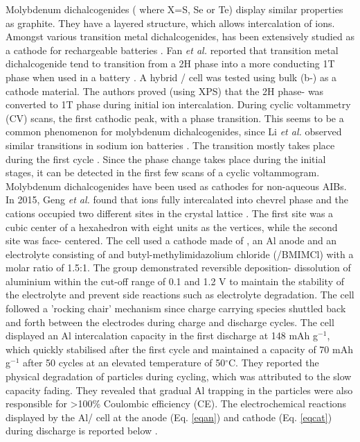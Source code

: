 Molybdenum dichalcogenides ( where X=S, Se or Te) display similar properties as graphite. They have a layered structure, which allows intercalation of ions. Amongst various transition metal dichalcogenides,  has been extensively studied as a cathode for rechargeable batteries \cite{li_mos2_2004, zhu_fast_2015}. Fan \textit{et al.} reported that transition metal dichalcogenide tend to transition from a 2H phase into a more conducting 1T phase when used in a battery \cite{fan_hybrid_2017}. A hybrid / cell was tested using bulk  (b-) as a cathode material. The authors proved (using XPS) that the 2H phase- was converted to 1T phase during initial ion intercalation. During cyclic voltammetry (CV) scans, the first cathodic peak, with a phase transition. This seems to be a common phenomenon for molybdenum dichalcogenides, since Li \textit{et al.} observed similar transitions in sodium ion batteries \cite{li_enhancing_2015}. The transition mostly takes place during the first cycle . Since the phase change takes place during the initial stages, it can be detected in the first few scans of a cyclic voltammogram. Molybdenum dichalcogenides have been used as cathodes for non-aqueous AIBs. In 2015, Geng \textit{et al.} found that  ions fully intercalated into chevrel phase  and the cations occupied two different sites in the crystal lattice \cite{geng_reversible_2015}. The first site was a cubic center of a hexahedron with eight  units as the vertices, while the second site was face- centered. The cell used a cathode made of , an Al anode and an electrolyte consisting of  and butyl-methylimidazolium chloride (/BMIMCl) with a molar ratio of 1.5:1. The group demonstrated reversible deposition- dissolution of aluminium within the cut-off range of 0.1 and 1.2 V to maintain the stability of the electrolyte and prevent side reactions such as electrolyte degradation. The cell followed a 'rocking chair' mechanism since charge carrying species shuttled back and forth between the electrodes during charge and discharge cycles. The cell displayed an Al intercalation capacity in the first discharge at 148 mAh g$^{-1}$, which quickly stabilised after the first cycle and maintained a capacity of 70 mAh g$^{-1}$ after 50 cycles at an elevated temperature of 50$^{\circ}$C. They reported the physical degradation of  particles during cycling, which was attributed to the slow capacity fading. They revealed that gradual Al trapping in the  particles were also responsible for >100\% Coulombic efficiency (CE). The electrochemical reactions displayed by the Al/ cell at the anode (Eq. \ref{eqan}) and cathode (Eq. \ref{eqcat}) during discharge is reported below \cite{geng_reversible_2015}. \\
